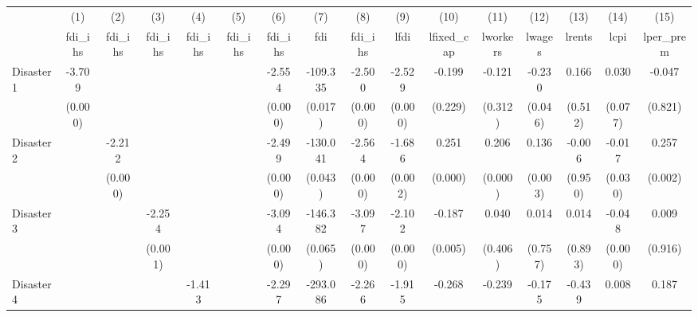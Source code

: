 \begin{tabular}{l*{15}{c}}
\hline\hline
            &\multicolumn{1}{c}{(1)}&\multicolumn{1}{c}{(2)}&\multicolumn{1}{c}{(3)}&\multicolumn{1}{c}{(4)}&\multicolumn{1}{c}{(5)}&\multicolumn{1}{c}{(6)}&\multicolumn{1}{c}{(7)}&\multicolumn{1}{c}{(8)}&\multicolumn{1}{c}{(9)}&\multicolumn{1}{c}{(10)}&\multicolumn{1}{c}{(11)}&\multicolumn{1}{c}{(12)}&\multicolumn{1}{c}{(13)}&\multicolumn{1}{c}{(14)}&\multicolumn{1}{c}{(15)}\\
            &\multicolumn{1}{c}{fdi\_ihs}&\multicolumn{1}{c}{fdi\_ihs}&\multicolumn{1}{c}{fdi\_ihs}&\multicolumn{1}{c}{fdi\_ihs}&\multicolumn{1}{c}{fdi\_ihs}&\multicolumn{1}{c}{fdi\_ihs}&\multicolumn{1}{c}{fdi}&\multicolumn{1}{c}{fdi\_ihs}&\multicolumn{1}{c}{lfdi}&\multicolumn{1}{c}{lfixed\_cap}&\multicolumn{1}{c}{lworkers}&\multicolumn{1}{c}{lwages}&\multicolumn{1}{c}{lrents}&\multicolumn{1}{c}{lcpi}&\multicolumn{1}{c}{lper\_prem}\\
\hline
Disaster 1  &      -3.709&            &            &            &            &      -2.554&    -109.335&      -2.500&      -2.529&      -0.199&      -0.121&      -0.230&       0.166&       0.030&      -0.047\\
            &     (0.000)&            &            &            &            &     (0.000)&     (0.017)&     (0.000)&     (0.000)&     (0.229)&     (0.312)&     (0.046)&     (0.512)&     (0.077)&     (0.821)\\
[1em]
Disaster 2  &            &      -2.212&            &            &            &      -2.499&    -130.041&      -2.564&      -1.686&       0.251&       0.206&       0.136&      -0.006&      -0.017&       0.257\\
            &            &     (0.000)&            &            &            &     (0.000)&     (0.043)&     (0.000)&     (0.002)&     (0.000)&     (0.000)&     (0.003)&     (0.950)&     (0.030)&     (0.002)\\
[1em]
Disaster 3  &            &            &      -2.254&            &            &      -3.094&    -146.382&      -3.097&      -2.102&      -0.187&       0.040&       0.014&       0.014&      -0.048&       0.009\\
            &            &            &     (0.001)&            &            &     (0.000)&     (0.065)&     (0.000)&     (0.000)&     (0.005)&     (0.406)&     (0.757)&     (0.893)&     (0.000)&     (0.916)\\
[1em]
Disaster 4  &            &            &            &      -1.413&            &      -2.297&    -293.086&      -2.266&      -1.915&      -0.268&      -0.239&      -0.175&      -0.439&       0.008&       0.187\\

\end{tabular}
